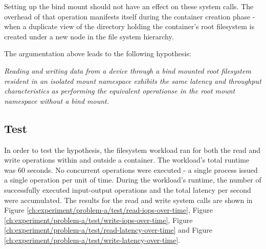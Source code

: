 Setting up the bind mount should not have an effect on these system calls. The overhead of that operation manifests itself
during the container creation phase - when a duplicate view of the directory holding 
the container's root filesystem is created under a new node in the file system hierarchy.

The argumentation above leads to the following hypothesis:

\textit{Reading and writing data from a device through a bind mounted root filesystem resident in an isolated mount namespace exhibits
the same latency and throughput characteristics as performing the equivalent operationse in the root mount namespace without a bind mount.}

\subsection{Test}
In order to test the hypothesis, the filesystem workload ran for both the read and write 
operations within and outside a container. The workload's total runtime was 60 seconds.
No concurrent operations were executed - a single process issued a single operation per unit of time. 
During the workload's runtime, the number of successfully executed input-output operations and the total latency per second 
were accumulated. The results for the read and write system calls are shown in Figure \ref{ch:experiment/problem-a/test/read-iops-over-time},
Figure \ref{ch:experiment/problem-a/test/write-iops-over-time}, Figure \ref{ch:experiment/problem-a/test/read-latency-over-time} and Figure \ref{ch:experiment/problem-a/test/write-latency-over-time}.

